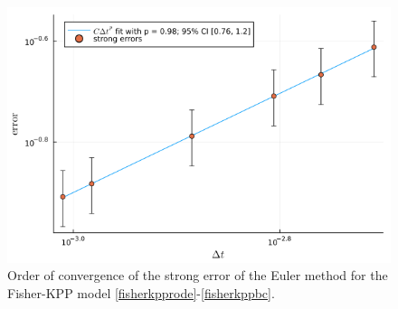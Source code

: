 \documentclass[reqno,12pt]{amsart}
\theoremstyle{plain} %
\theoremstyle{definition} %
\begin{document}
\begin{figure}[htb]
    \includegraphics[scale=0.4]{img/order_fisherkpp.png}
    \caption{Order of convergence of the strong error of the Euler method for the Fisher-KPP model \eqref{fisherkpprode}-\eqref{fisherkppbc}.}
    \label{figfisherkpp}
\end{figure}
\end{document}
